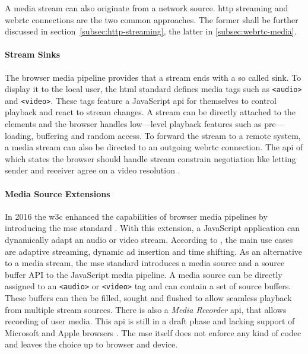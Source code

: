 A media stream can also originate from a network source. \Gls{http} streaming and \gls{webrtc} connections are the two common approaches. The former shall be further discussed in section~\ref{subsec:http-streaming}, the latter in \vref{subsec:webrtc-media}.

\paragraph{Stream Sinks}

The browser media pipeline provides that a stream ends with a so called sink. To display it to the local user, the \gls{html} standard \cite[\S4.7]{html-w3c} defines media tags such as \lstinline|<audio>| and \lstinline|<video>|. These tags feature a JavaScript \gls{api} for themselves to control playback and react to stream changes. A stream can be directly attached to the elements and the browser handles low—level playback features such as pre—loading, buffering and random access. To forward the stream to a remote system, a media stream can also be directed to an outgoing \gls{webrtc} connection. The \gls{api} of which states the browser should handle stream constrain negotiation like letting sender and receiver agree on a video resolution \cite[\S5.1]{webrtc-w3c}.

\paragraph{Media Source Extensions}

In 2016 the \gls{w3c} enhanced the capabilities of browser media pipelines by introducing the \gls{mse} standard \cite{media-source-extensions}. With this extension, a JavaScript application can dynamically adapt an audio or video stream. According to \cite{mse-google}, the main use cases are adaptive streaming, dynamic ad insertion and time shifting. As an alternative to a media stream, the \gls{mse} standard introduces a media source and a source buffer API to the JavaScript media pipeline. A media source can be directly assigned to an \lstinline|<audio>| or \lstinline|<video>| tag and can contain a set of source buffers. These buffers can then be filled, sought and flushed to allow seamless playback from multiple stream sources. There is also a \textit{Media Recorder} \gls{api}, that allows recording of user media. This \gls{api} is still in a draft phase and lacking support of Microsoft and Apple browsers \cite{media-recorder}. The \gls{mse} itself does not enforce any kind of codec and leaves the choice up to browser and device.

